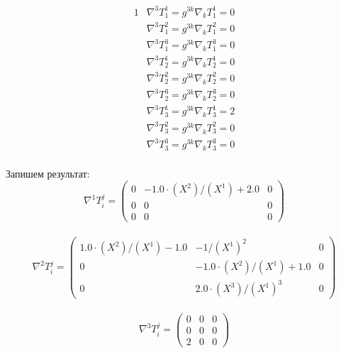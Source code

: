 \documentclass[a4paper, 12pt, oneside]{article}
\begin{document}
\begin{alignat*}{1}
  & \nabla^3T^1_1 = g^{3k}\nabla_kT^1_1 = 0 \\
  & \nabla^3T^2_1 = g^{3k}\nabla_kT^2_1 = 0 \\
  & \nabla^3T^3_1 = g^{3k}\nabla_kT^3_1 = 0 \\
  & \nabla^3T^1_2 = g^{3k}\nabla_kT^1_2 = 0 \\
  & \nabla^3T^2_2 = g^{3k}\nabla_kT^2_2 = 0 \\
  & \nabla^3T^3_2 = g^{3k}\nabla_kT^3_2 = 0 \\
  & \nabla^3T^1_3 = g^{3k}\nabla_kT^1_3 = 2 \\
  & \nabla^3T^2_3 = g^{3k}\nabla_kT^2_3 = 0 \\
  & \nabla^3T^3_3 = g^{3k}\nabla_kT^3_3 = 0 
\end{alignat*}\\
Запишем результат:\\
\[
\nabla^1T^j_i = \begin{pmatrix}
	0 & -1.0\cdot (X^2)/(X^1) + 2.0 & 0\\
	0 & 0 & 0\\
	0 & 0 & 0
\end{pmatrix}
\]\\
\[
\nabla^2T^j_i = \begin{pmatrix}
	1.0\cdot (X^2)/(X^1) - 1.0 & -1/(X^1)^2 & 0\\
	0 & -1.0\cdot (X^2)/(X^1) + 1.0 & 0\\
	0 & 2.0\cdot (X^3)/(X^1)^3 & 0
\end{pmatrix}
\]\\
\[
\nabla^3T^j_i = \begin{pmatrix}
	0 & 0 & 0\\
	0 & 0 & 0\\
	2 & 0 & 0
\end{pmatrix}
\]\\
\end{document}
